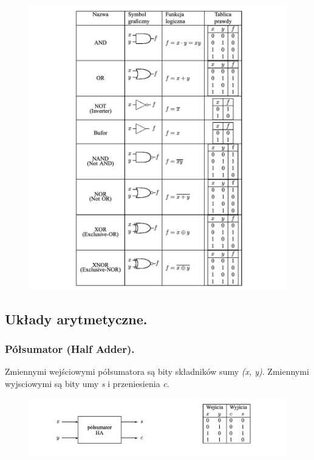 \documentclass[12pt]{article}
\begin{document}
    \begin{figure}[H]
        \includegraphics[width=\linewidth]{uk/bramki.png}
    \end{figure}

    \subsection{Układy arytmetyczne.}

    \subsubsection{Półsumator (Half Adder).}
    Zmiennymi wejściowymi półsumatora są bity składników sumy \textit{(x, y)}. Zmiennymi wyjsciowymi są bity
    umy \textit{s} i przeniesienia \textit{c}.

    \begin{figure}[H]
        \includegraphics[width=\linewidth]{uk/ha.png}
    \end{figure}
\end{document}
